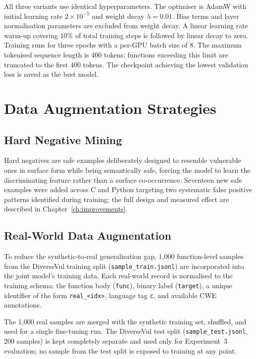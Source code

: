 All three variants use identical hyperparameters.
The optimiser is AdamW with initial learning rate $2 \times 10^{-5}$ and weight decay
$\lambda = 0.01$.
Bias terms and layer normalisation parameters are excluded from weight decay.
A linear learning rate warm-up covering 10\% of total training steps is followed by linear
decay to zero.
Training runs for three epochs with a per-GPU batch size of 8.
The maximum tokenised sequence length is 400 tokens; functions exceeding this limit are
truncated to the first 400 tokens.
The checkpoint achieving the lowest validation loss is saved as the best model.

\section{Data Augmentation Strategies}

\subsection{Hard Negative Mining}

Hard negatives are safe examples deliberately designed to resemble vulnerable ones in
surface form while being semantically safe, forcing the model to learn the discriminating
feature rather than a surface co-occurrence.
Seventeen new safe examples were added across C and Python targeting two systematic false
positive patterns identified during training; the full design and measured effect are
described in Chapter~\ref{ch:improvements}.

\subsection{Real-World Data Augmentation}

To reduce the synthetic-to-real generalisation gap, 1{,}000 function-level samples from
the DiverseVul training split (\texttt{sample\_train.jsonl}) are incorporated into the
joint model's training data.
Each real-world record is normalised to the training schema: the function body (\texttt{func}),
binary label (\texttt{target}), a unique identifier of the form \texttt{real\_<idx>},
language tag \texttt{c}, and available CWE annotations.

The 1{,}000 real samples are merged with the synthetic training set, shuffled, and used for
a single fine-tuning run.
The DiverseVul test split (\texttt{sample\_test.jsonl}, 200 samples) is kept completely
separate and used only for Experiment~3 evaluation; no sample from the test split is
exposed to training at any point.

